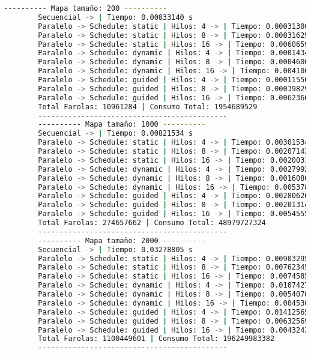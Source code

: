 \documentclass{article}
\begin{document}
	\begin{lstlisting}[style=consola, language=bash, caption={Salida de la ejecución del Ejercicio 3 completo}]
		---------- Mapa tamaño: 200 ----------
		Secuencial -> | Tiempo: 0.00033140 s
		Paralelo -> Schedule: static | Hilos: 4 -> | Tiempo: 0.00031300 s
		Paralelo -> Schedule: static | Hilos: 8 -> | Tiempo: 0.00031629 s
		Paralelo -> Schedule: static | Hilos: 16 -> | Tiempo: 0.00606599 s
		Paralelo -> Schedule: dynamic | Hilos: 4 -> | Tiempo: 0.00014344 s
		Paralelo -> Schedule: dynamic | Hilos: 8 -> | Tiempo: 0.00046062 s
		Paralelo -> Schedule: dynamic | Hilos: 16 -> | Tiempo: 0.00410690 s
		Paralelo -> Schedule: guided | Hilos: 4 -> | Tiempo: 0.00011550 s
		Paralelo -> Schedule: guided | Hilos: 8 -> | Tiempo: 0.00039829 s
		Paralelo -> Schedule: guided | Hilos: 16 -> | Tiempo: 0.00623665 s
		Total Farolas: 10961284 | Consumo Total: 1954689529
		--------------------------------------------
		---------- Mapa tamaño: 1000 ----------
		Secuencial -> | Tiempo: 0.00821534 s
		Paralelo -> Schedule: static | Hilos: 4 -> | Tiempo: 0.00301534 s
		Paralelo -> Schedule: static | Hilos: 8 -> | Tiempo: 0.00207143 s
		Paralelo -> Schedule: static | Hilos: 16 -> | Tiempo: 0.00200318 s
		Paralelo -> Schedule: dynamic | Hilos: 4 -> | Tiempo: 0.00279922 s
		Paralelo -> Schedule: dynamic | Hilos: 8 -> | Tiempo: 0.00160860 s
		Paralelo -> Schedule: dynamic | Hilos: 16 -> | Tiempo: 0.00537862 s
		Paralelo -> Schedule: guided | Hilos: 4 -> | Tiempo: 0.00280626 s
		Paralelo -> Schedule: guided | Hilos: 8 -> | Tiempo: 0.00201314 s
		Paralelo -> Schedule: guided | Hilos: 16 -> | Tiempo: 0.00545558 s
		Total Farolas: 274657662 | Consumo Total: 48979727324
		--------------------------------------------
		---------- Mapa tamaño: 2000 ----------
		Secuencial -> | Tiempo: 0.03278805 s
		Paralelo -> Schedule: static | Hilos: 4 -> | Tiempo: 0.00903295 s
		Paralelo -> Schedule: static | Hilos: 8 -> | Tiempo: 0.00762345 s
		Paralelo -> Schedule: static | Hilos: 16 -> | Tiempo: 0.00745852 s
		Paralelo -> Schedule: dynamic | Hilos: 4 -> | Tiempo: 0.01074274 s
		Paralelo -> Schedule: dynamic | Hilos: 8 -> | Tiempo: 0.00540706 s
		Paralelo -> Schedule: dynamic | Hilos: 16 -> | Tiempo: 0.00453005 s
		Paralelo -> Schedule: guided | Hilos: 4 -> | Tiempo: 0.01412565 s
		Paralelo -> Schedule: guided | Hilos: 8 -> | Tiempo: 0.00632569 s
		Paralelo -> Schedule: guided | Hilos: 16 -> | Tiempo: 0.00432434 s
		Total Farolas: 1100449601 | Consumo Total: 196249983382
		--------------------------------------------	\end{lstlisting}
\end{document}
